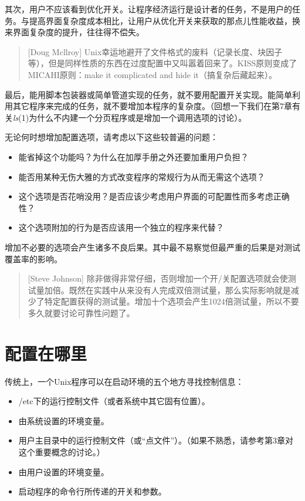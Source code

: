 \documentclass[12pt,oneside]{book}
\begin{document}
\begin{common-format}
其次，用户不应该看到优化开关。让程序经济运行是设计者的任务，不是用户的任务。与提高界面复杂度成本相比，让用户从优化开关来获取的那点儿性能收益，换来界面复杂度的提升，往往得不偿失。
\begin{quote}[Doug Mcllroy]
Unix幸运地避开了文件格式的废料（记录长度、块因子等），但是同样性质的东西在过度配置中又叫嚣着回来了。KISS原则变成了MICAHI原则：make it complicated and hide it（搞复杂后藏起来）。
\end{quote}

最后，能用脚本包装器或简单管道实现的任务，就不要用配置开关实现。能简单利用其它程序来完成的任务，就不要增加本程序的复杂度。（回想一下我们在第7章有关\textit{ls}(1)为什么不内建一个分页程序或是增加一个调用选项的讨论）。

无论何时想增加配置选项，请考虑以下这些较普遍的问题：
\begin{itemize}
\item  能省掉这个功能吗？为什么在加厚手册之外还要加重用户负担？
\item  能否用某种无伤大雅的方式改变程序的常规行为从而无需这个选项？
\item  这个选项是否花哨没用？是否应该少考虑用户界面的可配置性而多考虑正确性？
\item  这个选项附加的行为是否应该用一个独立的程序来代替？  
\end{itemize} 

增加不必要的选项会产生诸多不良后果。其中最不易察觉但最严重的后果是对测试覆盖率的影响。
\begin{quote}[Steve Johnson]
除非做得非常仔细，否则增加一个开/关配置选项就会使测试量加倍。既然在实践中从来没有人完成双倍测试量，那么实际影响就是减少了特定配置获得的测试量。增加十个选项会产生1024倍测试量，所以不要多久就要讨论可靠性问题了。
\end{quote}

\section{配置在哪里}
传统上，一个Unix程序可以在启动环境的五个地方寻找控制信息：
\begin{itemize}
\item /etc下的运行控制文件（或者系统中其它固有位置）。
\item 由系统设置的环境变量。
\item 用户主目录中的运行控制文件（或“点文件”）。（如果不熟悉，请参考第3章对这个重要概念的讨论。）
\item 由用户设置的环境变量。
\item 启动程序的命令行所传递的开关和参数。
\end{itemize}


\end{common-format}
\end{document}
